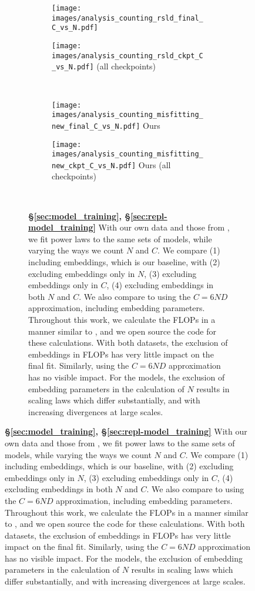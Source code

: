 \begin{figure}[]
\ContinuedFloat
\centering 
\begin{subfigure}{\textwidth}
    \centering
\begin{subfigure}{0.49\textwidth}
    \centering
    \texttt{[image: images/analysis\_counting\_rsld\_final\_C\_vs\_N.pdf]}
    \footnotesize{\citet{porian2024resolving}}
\end{subfigure}
\hfill
\begin{subfigure}{0.49\textwidth}
    \centering
    \texttt{[image: images/analysis\_counting\_rsld\_ckpt\_C\_vs\_N.pdf]}
    \footnotesize{\citet{porian2024resolving} (all checkpoints)}
\end{subfigure}
\\ \vspace{1em}
\begin{subfigure}{0.49\textwidth}
    \centering
    \texttt{[image: images/analysis\_counting\_misfitting\_new\_final\_C\_vs\_N.pdf]}
    \footnotesize{Ours}
\end{subfigure}
\hfill
\begin{subfigure}{0.49\textwidth}
    \centering
    \texttt{[image: images/analysis\_counting\_misfitting\_new\_ckpt\_C\_vs\_N.pdf]}
    \footnotesize{Ours (all checkpoints)}
\end{subfigure}
\\ \vspace{1em}
\caption{\textbf{\S\ref{sec:model_training}, \S\ref{sec:repl-model_training}} With our own data and those from \citet{porian2024resolving}, we fit power laws to the same sets of models, while varying the ways we count $N$ and $C$. We compare (1) including embeddings, which is our baseline, with (2) excluding embeddings only in $N$, (3) excluding embeddings only in $C$, (4) excluding embeddings in both $N$ and $C$. We also compare to using the $C=6ND$ approximation, including embedding parameters. Throughout this work, we calculate the FLOPs in a manner similar to \citet{hoffmann2022training}, and we open source the code for these calculations.
    With both datasets, the exclusion of embeddings in FLOPs has very little impact on the final fit. Similarly, using the $C=6ND$ approximation has no visible impact. For the \citet{porian2024resolving} models, the exclusion of embedding parameters in the calculation of $N$ results in scaling laws which differ substantially, and with increasing divergences at large scales. 
    }
    \label{fig:analysis_counting_app}
\end{subfigure}
\end{figure}

